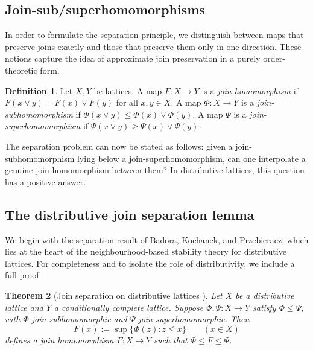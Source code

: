 \documentclass[11pt]{amsart}
\newtheorem{theorem}{Theorem}[section]
\theoremstyle{definition}
\newtheorem{definition}[theorem]{Definition}
\newcommand{\join}{\vee}
\begin{document}
\subsection{Join-sub/superhomomorphisms}
In order to formulate the separation principle, we distinguish between maps that preserve
joins exactly and those that preserve them only in one direction.
These notions capture the idea of approximate join preservation in a purely order-theoretic form.

\begin{definition}
Let $X,Y$ be lattices.
A map $F\colon X\to Y$ is a \emph{join homomorphism} if $F(x\join y)=F(x)\join F(y)$ for all $x,y\in X$.
A map $\Phi\colon X\to Y$ is a \emph{join-subhomomorphism} if $\Phi(x\join y)\le \Phi(x)\join\Phi(y)$.
A map $\Psi$ is a \emph{join-superhomomorphism} if $\Psi(x\join y)\ge \Psi(x)\join\Psi(y)$.
\end{definition}
The separation problem can now be stated as follows: given a join-subhomomorphism lying below
a join-superhomomorphism, can one interpolate a genuine join homomorphism between them?
In distributive lattices, this question has a positive answer.

\subsection{The distributive join separation lemma}
We begin with the separation result of Badora, Kochanek, and Przebieracz, which lies at the
heart of the neighbourhood-based stability theory for distributive lattices.
For completeness and to isolate the role of distributivity, we include a full proof.

\begin{theorem}[Join separation on distributive lattices {\cite[Lemma~6]{BKP}}]\label{thm:join-sep-distrib}
Let $X$ be a distributive lattice and $Y$ a conditionally complete lattice.
Suppose $\Phi,\Psi\colon X\to Y$ satisfy $\Phi\le \Psi$, with $\Phi$ join-subhomomorphic and $\Psi$ join-superhomomorphic.
Then
\[
F(x):=\sup\{\Phi(z): z\le x\}\qquad(x\in X)
\]
defines a join homomorphism $F\colon X\to Y$ such that $\Phi\le F\le \Psi$.
\end{theorem}
\end{document}
